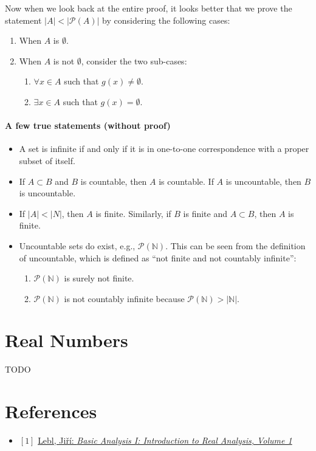 \documentclass[12pt, letterpaper, oneside]{book}
\begin{document}
Now when we look back at the entire proof, it looks better that we prove the
statement $|A| < |\mathcal{P}(A)|$ by considering the following cases:
\begin{enumerate}
  \item When $A$ is $\emptyset$.
  \item When $A$ is not $\emptyset$, consider the two sub-cases:
  \begin{enumerate}
    \item $\forall x \in A$ such that $g(x) \neq \emptyset$.
    \item $\exists x \in A$ such that $g(x) = \emptyset$.
  \end{enumerate}
\end{enumerate}

\subsubsection{A few true statements (without proof)}

\begin{itemize}
  \item A set is infinite if and only if it is in one-to-one correspondence
    with a proper subset of itself.
  \item If $A \subset B$ and $B$ is countable, then $A$ is countable. If $A$ is
    uncountable, then $B$ is uncountable.
  \item If $|A| < |N|$, then $A$ is finite. Similarly, if $B$ is finite and $A
    \subset B$, then $A$ is finite.
  \item Uncountable sets do exist, e.g., $\mathcal{P}(\mathbb{N})$. This can be
    seen from the definition of uncountable, which is defined as ``not finite
    and not countably infinite'':
    \begin{enumerate}
      \item $\mathcal{P}(\mathbb{N})$ is surely not finite.
      \item $\mathcal{P}(\mathbb{N})$ is not countably infinite because
        $\mathcal{P}(\mathbb{N}) > |\mathbb{N}|$.
    \end{enumerate}
\end{itemize}

%
%

\chapter{Real Numbers}

TODO

\chapter*{References}

\begin{itemize}
  \item $[1]$ \href{https://ocw.mit.edu/courses/18-100a-real-analysis-fall-2020/resources/mit18_100af20_basic_analysis/}{Lebl, Jiří: \it{Basic Analysis I: Introduction to Real Analysis, Volume 1}}
\end{itemize}
\end{document}
